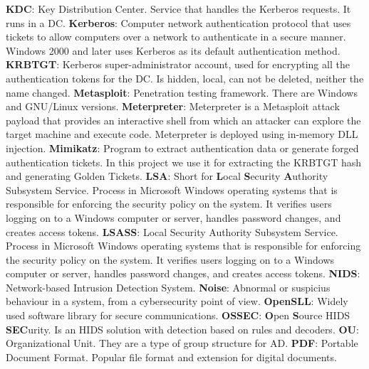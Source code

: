 \linej
\linej
\textbf{KDC}: Key Distribution Center. Service that handles the Kerberos requests. It runs in a DC.
\linej
\linej
\textbf{Kerberos}: Computer network authentication protocol that uses tickets to allow computers over a network to authenticate in a secure manner. Windows 2000 and later uses Kerberos as its default authentication method.
\linej
\linej
\textbf{KRBTGT}: Kerberos super-administrator account, used for encrypting all the authentication tokens for the DC. Is hidden, local, can not be deleted, neither the name changed.
\linej
\linej
\textbf{Metasploit}: Penetration testing framework. There are Windows and GNU/Linux versions.
\linej
\linej
\textbf{Meterpreter}: Meterpreter is a Metasploit attack payload that provides an interactive shell from which an attacker can explore the target machine and execute code. Meterpreter is deployed using in-memory DLL injection.
\linej
\linej
\textbf{Mimikatz}: Program to extract authentication data or generate forged authentication tickets. In this project we use it for extracting the KRBTGT hash and generating Golden Tickets.
\linej
\linej
\textbf{LSA}: Short for \textbf{L}ocal \textbf{S}ecurity \textbf{A}uthority Subsystem Service. Process in Microsoft Windows operating systems that is responsible for enforcing the security policy on the system. It verifies users logging on to a Windows computer or server, handles password changes, and creates access tokens.
\linej
\linej
\textbf{LSASS}: Local Security Authority Subsystem Service. Process in Microsoft Windows operating systems that is responsible for enforcing the security policy on the system. It verifies users logging on to a Windows computer or server, handles password changes, and creates access tokens.
\linej
\linej
\textbf{NIDS}: Network-based Intrusion Detection System.
\linej
\linej
\textbf{Noise}: Abnormal or suspicius behaviour in a system, from a cybersecurity point of view.
\linej
\linej
\textbf{OpenSLL}: Widely used software library for secure communications.
\linej
\linej
\textbf{OSSEC}: \textbf{O}pen \textbf{S}ource HIDS \textbf{SEC}urity. Is an HIDS solution with detection based on rules and decoders.
\linej
\linej
\textbf{OU}: Organizational Unit. They are a type of group structure for AD.
\linej
\linej
\textbf{PDF}: Portable Document Format. Popular file format and extension for digital documents.
